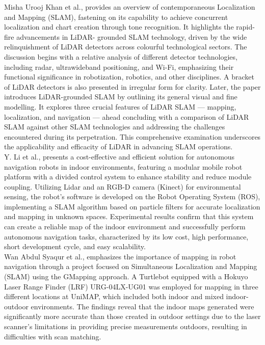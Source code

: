 {		Misha Urooj Khan et al., provides an overview of contemporaneous Localization and
		Mapping (SLAM), fastening on its capability to achieve concurrent localization and chart
		creation through tone recognition. It highlights the rapid-fire advancements in LiDAR-
		grounded SLAM technology, driven by the wide relinquishment of LiDAR detectors across
		colourful technological sectors. The discussion begins with a relative analysis of different
		detector technologies, including radar, ultrawideband positioning, and Wi-Fi, emphasizing
		their functional significance in robotization, robotics, and other disciplines. A bracket of
		LiDAR detectors is also presented in irregular form for clarity. Later, the paper introduces
		LiDAR-grounded SLAM by outlining its general visual and fine modelling. It explores three
		crucial features of LiDAR SLAM — mapping, localization, and navigation — ahead
		concluding with a comparison of LiDAR SLAM against other SLAM technologies and
		addressing the challenges encountered during its perpetration. This comprehensive
		examination underscores the applicability and efficacity of LiDAR in advancing SLAM
		operations. \cite{9526266}\\
		
		Y. Li et al., presents a cost-effective and efficient solution for autonomous navigation robots in indoor environments, featuring a modular mobile robot platform with a divided control system to enhance stability and reduce module coupling. Utilizing Lidar and an RGB-D camera (Kinect) for environmental sensing, the robot's software is developed on the Robot Operating System (ROS), implementing a SLAM algorithm based on particle filters for accurate localization and mapping in unknown spaces. Experimental results confirm that this system can create a reliable map of the indoor environment and successfully perform autonomous navigation tasks, characterized by its low cost, high performance, short development cycle, and easy scalability. \cite{8623225}\\
		
		Wan Abdul Syaqur et al., emphasizes the importance of mapping in robot navigation through a project focused on Simultaneous Localization and Mapping (SLAM) using the GMapping approach. A Turtlebot equipped with a Hokuyo Laser Range Finder (LRF) URG-04LX-UG01 was employed for mapping in three different locations at UniMAP, which included both indoor and mixed indoor-outdoor environments. The findings reveal that the indoor maps generated were significantly more accurate than those created in outdoor settings due to the laser scanner's limitations in providing precise measurements outdoors, resulting in difficulties with scan matching. \cite{8477629}\\
		
}
